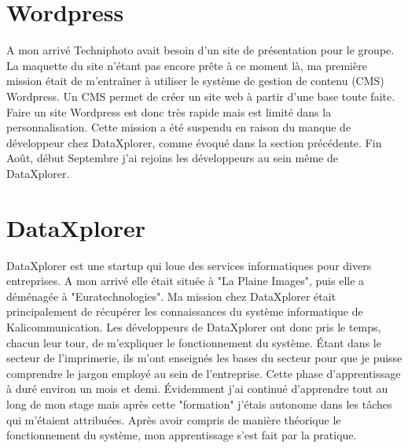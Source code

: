 
\section{Wordpress}
A mon arrivé Techniphoto avait besoin d'un site de présentation pour le groupe. La maquette du site n'étant pas encore prête à ce moment là, ma première mission était de m'entraîner à utiliser le système de gestion de contenu (CMS) Wordpress. Un CMS permet de créer un site web à partir d'une base toute faite. Faire un site Wordpress est donc très rapide mais est limité dans la personnalisation.\newline
Cette mission a été suspendu en raison du manque de développeur chez DataXplorer, comme évoqué dans la section précédente. Fin Août, début Septembre j'ai rejoins les développeurs au sein même de DataXplorer.

\section{DataXplorer}
DataXplorer est une startup qui loue des services informatiques pour divers entreprises. A mon arrivé elle était située à "La Plaine Images", puis elle a déménagée à "Euratechnologies". Ma mission chez DataXplorer était principalement de récupérer les connaissances du système informatique de Kalicommunication. Les développeurs de DataXplorer ont donc pris le temps, chacun leur tour, de m'expliquer le fonctionnement du système. Étant dans le secteur de l'imprimerie, ils m'ont enseignés les bases du secteur pour que je puisse comprendre le jargon employé au sein de l'entreprise. Cette phase d'apprentissage à duré environ un mois et demi. Évidemment j'ai continué d'apprendre tout au long de mon stage mais après cette "formation" j'étais autonome dans les tâches qui m'étaient attribuées.\newline
Après avoir compris de manière théorique le fonctionnement du système, mon apprentissage s'est fait par la pratique.
